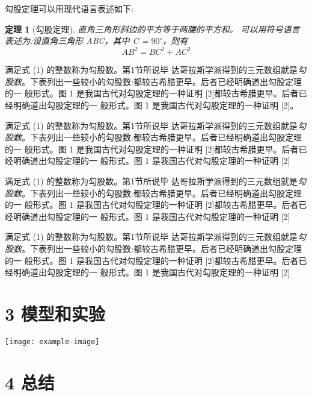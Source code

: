 \documentclass[twocolumn]{ctexart}
\newtheorem{thm}{定理}
\begin{document}
勾股定理可以用现代语言表述如下:


\begin{thm}[勾股定理] 

    直角三角形斜边的平方等于两腰的平方和。
    可以用符号语言表述为:设直角三角形 ABC，其中 \angle C = $90^\circ$，则有
\begin{equation}
    AB^2 = BC^2 + AC^2  
\end{equation}

\end{thm}
满足式 (1) 的整数称为勾股数。第1节所说毕 达哥拉斯学派得到的三元数组就是\emph{勾股数}。下表列出一些较小的勾股数:都较古希腊更早。后者已经明确道出勾股定理的一 般形式。图 1 是我国古代对勾股定理的一种证明 [2]都较古希腊更早。后者已经明确道出勾股定理的一 般形式。图 1 是我国古代对勾股定理的一种证明 [2]。

满足式 (1) 的整数称为勾股数。第1节所说毕 达哥拉斯学派得到的三元数组就是\emph{勾股数}。下表列出一些较小的勾股数:都较古希腊更早。后者已经明确道出勾股定理的一 般形式。图 1 是我国古代对勾股定理的一种证明 [2]都较古希腊更早。后者已经明确道出勾股定理的一 般形式。图 1 是我国古代对勾股定理的一种证明 [2]

满足式 (1) 的整数称为勾股数。第1节所说毕 达哥拉斯学派得到的三元数组就是\emph{勾股数}。下表列出一些较小的勾股数:都较古希腊更早。后者已经明确道出勾股定理的一 般形式。图 1 是我国古代对勾股定理的一种证明 [2]都较古希腊更早。后者已经明确道出勾股定理的一 般形式。图 1 是我国古代对勾股定理的一种证明 [2]

满足式 (1) 的整数称为勾股数。第1节所说毕 达哥拉斯学派得到的三元数组就是\emph{勾股数}。下表列出一些较小的勾股数:都较古希腊更早。后者已经明确道出勾股定理的一 般形式。图 1 是我国古代对勾股定理的一种证明 [2]都较古希腊更早。后者已经明确道出勾股定理的一 般形式。图 1 是我国古代对勾股定理的一种证明 [2]

\section*{3 模型和实验}

\lipsum[2-3]


\begin{strip}
    \centering\texttt{[image: example-image]}
\end{strip}

\lipsum[4-8]
\section*{4 总结}
\lipsum[9-10]

\end{document}
